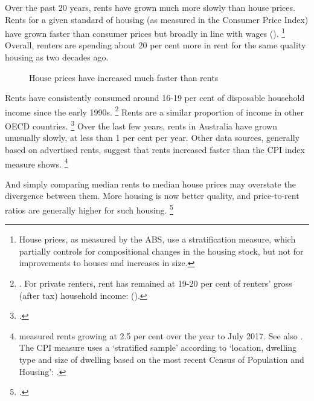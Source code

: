 Over the past 20 years, rents have grown much more slowly than house prices.
Rents for a given standard of housing (as measured in the Consumer Price Index) have grown faster than consumer prices but broadly in line with wages ().%
	\footnote{House prices, as measured by the ABS, use a stratification measure, which partially controls for compositional changes in the housing stock, but not for improvements to houses and increases in size.}
Overall, renters are spending about 20 per cent more in rent for the same quality housing as two decades ago.

\begin{figure}
\caption{House prices have increased much faster than rents}\label{fig:rents-v-house-prices}
\end{figure}

Rents have consistently consumed around 16-19 per cent of disposable household income since the early 1990s.%
	\footnote{\textcite{Kent2013Developments}.
    For private renters, rent has remained at 19-20 per cent of renters' gross (after tax) household income: (\textcite{ABS-201314-occupancy-and-costs}).}
Rents are a similar proportion of income in other OECD countries.%
	\footcite[][Table~HC~1.2]{OECD2017housingdatabase}
Over the last few years, rents in Australia have grown unusually slowly, at less than 1 per cent per year. Other data sources, generally based on advertised rents, suggest that rents increased faster than the CPI index measure shows.%
	\footnote{\textcite{CoreLogic2017} measured rents growing at 2.5 per cent over the year to July 2017.
	See also \textcite{SQM-research-weekly-rents}. The CPI measure uses a `stratified sample' according to `location, dwelling type and size of dwelling based on the most recent Census of Population and Housing': \textcite[][66]{ABS-2016cNationalAccounts}.}

And simply comparing median rents to median house prices may overstate the divergence between them.
More housing is now better quality, and price-to-rent ratios are generally higher for such housing.%
	\footcites{HillandSyed2016}{Bracke2015houseprices}

